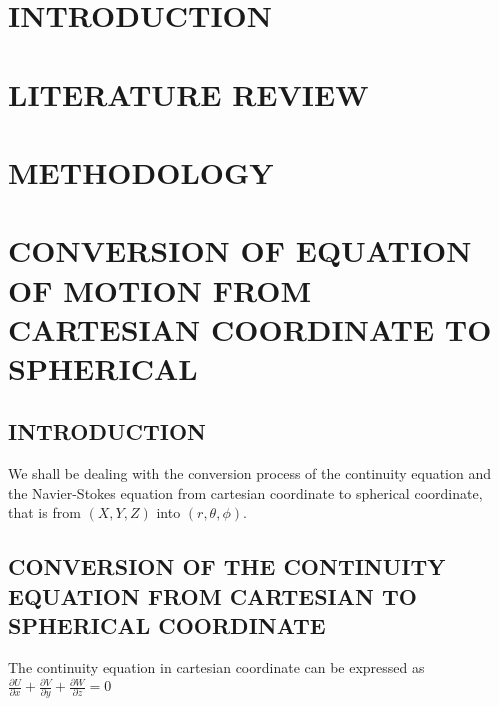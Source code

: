 \documentclass[12pt]{report}
\newcommand{\sps}{\\[0.2cm]}
\newcommand{\dsp}{\displaystyle}
\begin{document}
	\chapter{INTRODUCTION}

	\chapter{LITERATURE REVIEW}
	
	\chapter{METHODOLOGY}
	
	\chapter{CONVERSION OF EQUATION OF MOTION FROM CARTESIAN COORDINATE TO SPHERICAL}
	\section{INTRODUCTION}
	We shall be dealing with the conversion process of the continuity equation and the Navier-Stokes equation from cartesian coordinate to spherical coordinate, that is from $(X,Y,Z)$ into $(r,\theta, \phi)$.
	
	\section{CONVERSION OF THE CONTINUITY EQUATION FROM CARTESIAN TO SPHERICAL COORDINATE}
	The continuity equation in cartesian coordinate can be expressed as\sps $\dsp \frac{\partial U}{\partial x} + \frac{\partial V}{\partial y} + \frac{\partial W}{\partial z} = 0$\\
	
\end{document}
